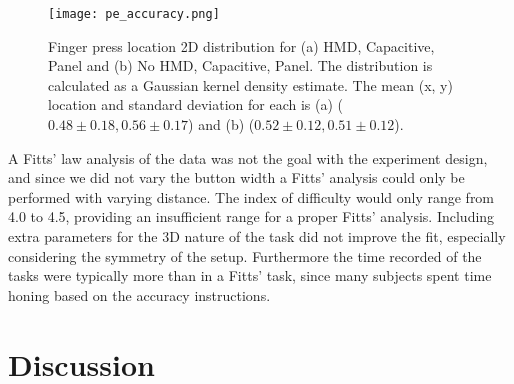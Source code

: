 \begin{figure}
    \centering
    \texttt{[image: pe\_accuracy.png]}
    \caption{Finger press location 2D distribution for (a) HMD, Capacitive, Panel and (b) No HMD, Capacitive, Panel. The distribution is calculated as a Gaussian kernel density estimate. The mean (x, y) location and standard deviation for each is (a) ($0.48\pm0.18, 0.56\pm0.17$) and (b) ($0.52\pm0.12, 0.51\pm0.12$).}
    \label{fig:pe_accuracy}
\end{figure}

A Fitts’ law analysis of the data was not the goal with the experiment design, and since we did not vary the button width a Fitts’ analysis could only be performed with varying distance.
The index of difficulty would only range from 4.0 to 4.5, providing an insufficient range for a proper Fitts’ analysis.
Including extra parameters for the 3D nature of the task \citep{murata_extending_2001, cha_extended_2013} did not improve the fit, especially considering the symmetry of the setup.
Furthermore the time recorded of the tasks were typically more than in a Fitts' task, since many subjects spent time honing based on the accuracy instructions.



\section{Discussion}

